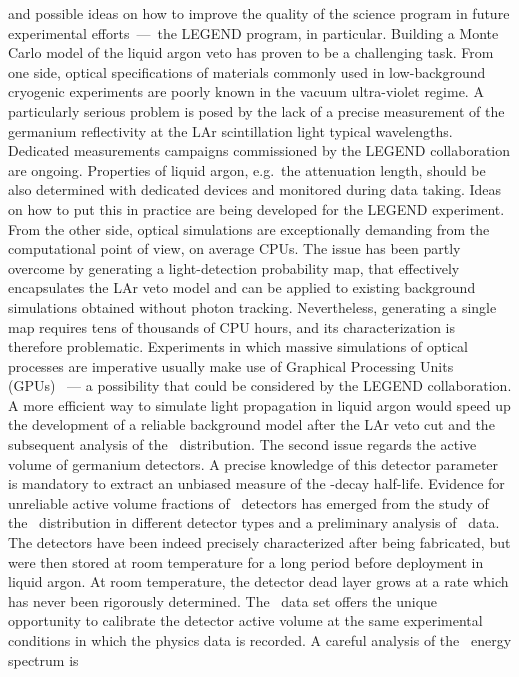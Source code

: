 and possible ideas on how to improve the quality of the science program in future
experimental efforts~---~the LEGEND program, in particular. Building a Monte Carlo model
of the liquid argon veto has proven to be a challenging task. From one side, optical
specifications of materials commonly used in low-background cryogenic experiments are
poorly known in the vacuum ultra-violet regime. A particularly serious problem is posed by
the lack of a precise measurement of the germanium reflectivity at the LAr scintillation
light typical wavelengths. Dedicated measurements campaigns commissioned by the LEGEND
collaboration are ongoing.  Properties of liquid argon, e.g.~the attenuation length,
should be also determined with dedicated devices and monitored during data taking. Ideas
on how to put this in practice are being developed for the LEGEND experiment. From the
other side, optical simulations are exceptionally demanding from the computational point
of view, on average CPUs. The issue has been partly overcome by generating a
light-detection probability map, that effectively encapsulates the LAr veto model and can
be applied to existing background simulations obtained without photon tracking.
Nevertheless, generating a single map requires tens of thousands of CPU hours, and its
characterization is therefore problematic. Experiments in which massive simulations of
optical processes are imperative usually make use of Graphical Processing Units
(GPUs)~\cite{Merck2012, Blyth2019} --- a possibility that could be considered by the
LEGEND collaboration. A more efficient way to simulate light propagation in liquid argon
would speed up the development of a reliable background model after the LAr veto cut and
the subsequent analysis of the \nnbb\ distribution.
\newpar
The second issue regards the active volume of germanium detectors. A precise knowledge of
this detector parameter is mandatory to extract an unbiased measure of the \nnbb-decay
half-life. Evidence for unreliable active volume fractions of \bege\ detectors has emerged
from the study of the \nnbb\ distribution in different detector types and a preliminary
analysis of \Arl\ data.  The detectors have been indeed precisely characterized after
being fabricated, but were then stored at room temperature for a long period before
deployment in liquid argon. At room temperature, the detector dead layer grows at a rate
which has never been rigorously determined. The \Arl\ data set offers the unique
opportunity to calibrate the detector active volume at the same experimental conditions in
which the physics data is recorded. A careful analysis of the \Arl\ energy spectrum is
